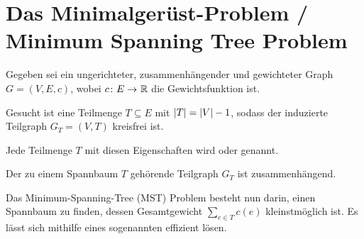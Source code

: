 \section{Das Minimalgerüst-Problem / Minimum Spanning Tree Problem}

Gegeben sei ein ungerichteter, zusammenhängender und gewichteter Graph $G = (V,E,c)$, wobei $\abb{c}{E}{\R}$ die Gewichtsfunktion ist.

Gesucht ist eine Teilmenge $T \subseteq E$ mit $\left| T \right| = \left| V \right| - 1$, sodass der induzierte Teilgraph $G_T = (V,T)$ kreisfrei ist.

\begin{definition}
	Jede Teilmenge $T$ mit diesen Eigenschaften wird  oder  genannt.
\end{definition}

\begin{bemerkung}
	Der zu einem Spannbaum $T$ gehörende Teilgraph $G_T$ ist zusammenhängend.
\end{bemerkung}

Das Minimum-Spanning-Tree (MST) Problem besteht nun darin, einen Spannbaum zu finden, dessen Gesamtgewicht $\sum_{e \in T} c(e)$ kleinstmöglich ist. Es lässt sich mithilfe eines sogenannten  effizient lösen.